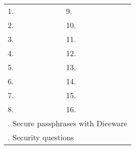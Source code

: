 \newpage


\newcommand{\myrule}{
	\hdashrule{1.35in}{0.5pt}{1.25pt}
}
\newcommand{\myrulespace}{
	\vspace{.24in}
}

\Large
\begin{center}
		
\textbf{}
\vspace{.275in}

\setlength{\tabcolsep}{1pt}
\begin{tabular}{l l l l }
	1. & \myrule &  9. & \myrule \myrulespace \\
	2. & \myrule & 10. & \myrule \myrulespace \\
	3. & \myrule & 11. & \myrule \myrulespace \\
	4. & \myrule & 12. & \myrule \myrulespace \\
	5. & \myrule & 13. & \myrule \myrulespace \\
	6. & \myrule & 14. & \myrule \myrulespace \\
	7. & \myrule & 15. & \myrule \myrulespace \\
	8. & \myrule & 16. & \myrule \vspace{.15in} \\
	\multicolumn{4}{l}{\pageref{ch:diceware}. Secure passphrases with Diceware} \vspace{.15in} \\
	\multicolumn{4}{l}{\pageref{ch:qna}. Security questions} \\
\end{tabular}

\end{center}

\newpage
\small
